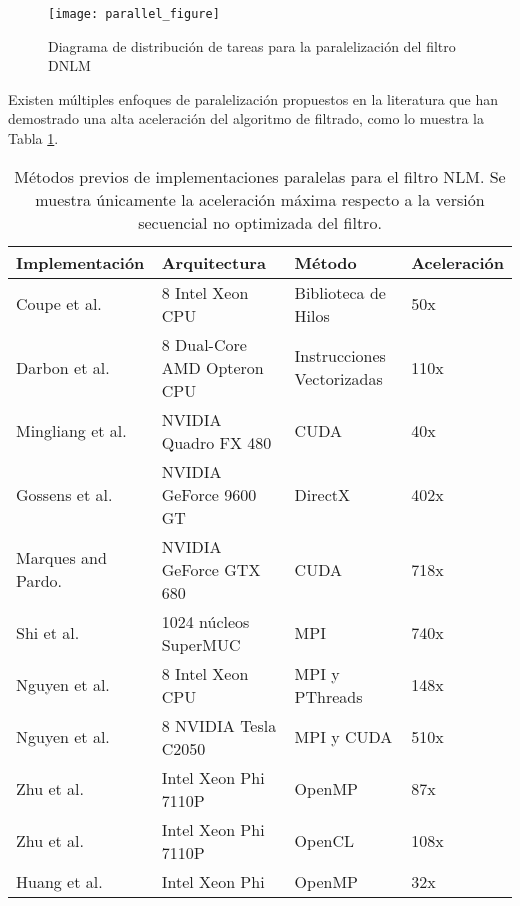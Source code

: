 \begin{figure}[H]
   \centering
   \caption[Diagrama de distribuci\'on de tareas paralelas]{Diagrama de distribuci\'on de tareas para la paralelizaci\'on del filtro DNLM}
   \texttt{[image: parallel\_figure]}
   \label{fig:parallel_figure}
 \end{figure}
 

Existen m\'ultiples enfoques de paralelizaci\'on propuestos en la literatura que han demostrado una alta aceleraci\'on del algoritmo de filtrado, como lo muestra la Tabla \ref{method_table}. 


\begin{table}
\caption{M\'etodos previos de implementaciones paralelas para el filtro NLM. Se muestra \'unicamente la aceleraci\'on m\'axima respecto a la versi\'on secuencial no optimizada del filtro.}
\begin{tabularx}{1\linewidth}{X X X X} 
\hline
Implementaci\'on & Arquitectura & M\'etodo & Aceleraci\'on \\ [0.5ex]
 \hline\hline
 Coupe et al. \cite{coupe2006fast} &  8 Intel Xeon CPU & Biblioteca de Hilos & 50x\\
 Darbon et al. \cite{Darbon2008} &  8 Dual-Core AMD Opteron CPU & Instrucciones Vectorizadas & 110x\\
 Mingliang et al. \cite{mingliang2016medical} &  NVIDIA Quadro FX 480 & CUDA & 40x\\
Gossens et al. \cite{goossens2010gpu} &  NVIDIA GeForce 9600 GT & DirectX & 402x\\
Marques and Pardo. \cite{marques2013implementation} &  NVIDIA GeForce GTX 680 & CUDA & 718x\\ 
Shi et al. \cite{shi2015optimized} &   1024 n\'ucleos SuperMUC & MPI & 740x\\
Nguyen et al. \cite{nguyen2016medical} &   8 Intel Xeon CPU & MPI y PThreads & 148x\\
Nguyen et al. \cite{nguyen2016medical} &   8 NVIDIA Tesla C2050 & MPI y CUDA & 510x\\
Zhu et al. \cite{zhu2016parallel} &  Intel Xeon Phi 7110P & OpenMP & 87x\\
Zhu et al. \cite{zhu2016parallel} &  Intel Xeon Phi 7110P & OpenCL & 108x\\
Huang et al. \cite{huang2017parallel} &  Intel Xeon Phi & OpenMP & 32x\\
\end{tabularx}
\label{method_table}
\end{table}


